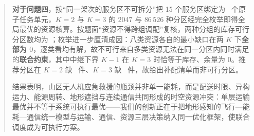 \documentclass[bwprint]{gmcmthesis}
\begin{document}
\begin{abstract}
	\textbf{对于问题四}，按“同一架次的服务区不可拆分”把 15 个服务区绑定为 \mtQfourUnits\ 个原子任务单元，$K=2$ 与 $K=3$ 的 2047 与 $86\,526$ 种分区经完全枚举即得全局最优的资源核算。按题面“资源不得跨组调配”复核，两种分组的库存可行分区数均为 \mtQfourFeasible；枚举进一步厘清成因：八类资源各自的最小缺口在两 $K$ 下\textbf{全部为 $0$}，逐类看均有解，故不可行来自多类资源无法在同一分区内同时满足的\textbf{联合约束}，其中中继下界 $K-1$ 在 $K=3$ 时恰等于库存、余量为 $0$。推荐分区在 $K=2$ 缺 \mtQfourGapSum\ 件、$K=3$ 缺 \mtQfourMinPatchKThree\ 件，故给出补配清单而非可行分区。

	结果表明，山区无人机应急救援的瓶颈并非单一能耗，而是配送时限、异构运力、能源周转、地形遮挡与连续通信共同形成的时空资源冲突：单层运输最优并不等于系统可执行最优——我们的创新正在于把地形感知的飞行—能耗—通信统一模型与运输、通信、资源三层决策纳入同一优化框架，使联合调度成为可执行方案。

\end{abstract}

\maketoc
\clearpage

\pagestyle{plain}




\clearpage
\begin{appendices}
\setcounter{table}{0}\setcounter{figure}{0}\setcounter{equation}{0}
\renewcommand{\thetable}{\Alph{section}.\arabic{table}}
\renewcommand{\thefigure}{\Alph{section}.\arabic{figure}}
\renewcommand{\theequation}{\Alph{section}.\arabic{equation}}

\end{appendices}
\end{document}
